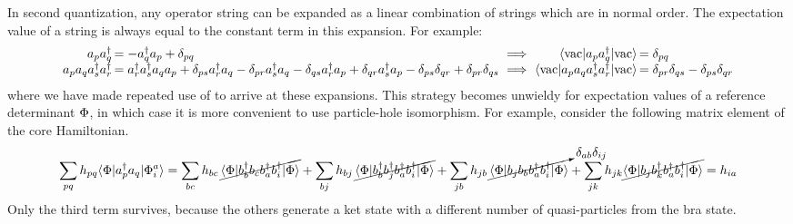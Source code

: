 \documentclass[11pt]{article}
\numberwithin{equation}{section}
\begin{document}
\begin{ex}
In second quantization, any operator string can be expanded as a linear combination of strings which are in normal order.
The expectation value of a string is always equal to the constant term in this expansion.
For example:
\begin{align*}
\begin{array}{r@{\,}l@{\ }c@{\ }r@{\,}l}
  a_p a_q\dg
&=
-
  a_q\dg a_p
+
  \d_{pq}
&\implies&
  \ip{\vac|a_p a_q\dg|\vac}
&=
  \d_{pq}
\\
  a_p a_q a_s\dg a_r\dg
&=
  a_r\dg a_s\dg a_q a_p
+
  \d_{ps}
  a_r\dg a_q
-
  \d_{pr}
  a_s\dg a_q
-
  \d_{qs}
  a_r\dg a_p
+
  \d_{qr}
  a_s\dg a_p
-
  \d_{ps}\d_{qr}
+
  \d_{pr}\d_{qs}
&\implies&
  \ip{\vac|a_p a_q a_s\dg a_r\dg|\vac}
&=
  \d_{pr}\d_{qs}
-
  \d_{ps}\d_{qr}
\end{array}
\end{align*}
where we have made repeated use of  to arrive at these expansions.
This strategy becomes unwieldy for expectation values of a reference determinant $\Phi $, in which case it is more convenient to use particle-hole isomorphism.
For example, consider the following matrix element of the core Hamiltonian.
\begin{align*}
  \sum_{pq}
  h_{pq}
  \langle\Phi |a_p^\dagger a_q|\Phi _i^a\rangle
=
  \sum_{bc}
  h_{bc}\,
  \cancel{\langle\Phi |b_b^\dagger b_c b_a^\dagger b_i^\dagger|\Phi \rangle}
+
  \sum_{bj}
  h_{bj}\,
  \cancel{\langle\Phi |b_b^\dagger b_j^\dagger b_a^\dagger b_i^\dagger|\Phi \rangle}
+
  \sum_{jb}
  h_{jb}\,
  \cancelto{\delta _{ab}\delta _{ij}}{\langle\Phi |b_j b_b b_a^\dagger b_i^\dagger|\Phi \rangle}
+
  \sum_{jk}
  h_{jk}
  \cancel{\langle\Phi |b_j b_k^\dagger b_a^\dagger b_i^\dagger|\Phi \rangle}
=
  h_{ia}
\end{align*}
Only the third term survives, because the others generate a ket state with a different number of quasi-particles from the bra state.
\end{ex}
\end{document}
